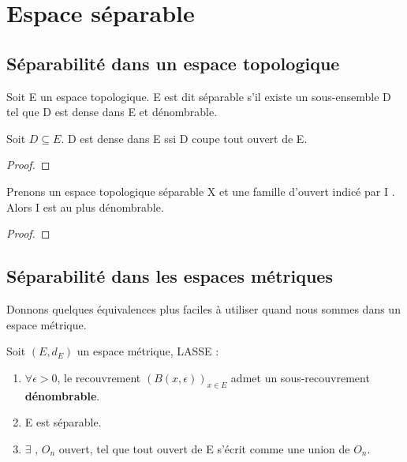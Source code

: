 \section{Espace séparable}

\subsection{Séparabilité dans un espace topologique}

\begin{definition}
	Soit E un espace topologique.
	E est dit séparable s'il existe un sous-ensemble D tel que D est dense dans
	E et dénombrable.
\end{definition}

\begin{proposition}
	Soit $D \subseteq E$.
	D est dense dans E ssi D coupe tout ouvert de E.
\end{proposition}

\begin{proof}

\end{proof}

\begin{proposition}
	Prenons un espace topologique séparable X et une famille d'ouvert indicé par
	I . Alors I est au plus dénombrable.
\end{proposition}

\begin{proof}
	
\end{proof}

\subsection{Séparabilité dans les espaces métriques}

Donnons quelques équivalences plus faciles à utiliser quand nous sommes dans un
espace métrique.

\begin{proposition}
	Soit $(E, d_{E})$ un espace métrique, LASSE :
	\begin{enumerate}
		\item $\forall \epsilon > 0$, le recouvrement $(B(x, \epsilon))_{x \in
			E}$ admet un sous-recouvrement \textbf{dénombrable}.
		\item E est séparable.
		\item $\exists$ , $O_{n}$ ouvert, tel que
			tout ouvert de E s'écrit comme une union de $O_{n}$.
	\end{enumerate}
\end{proposition}

